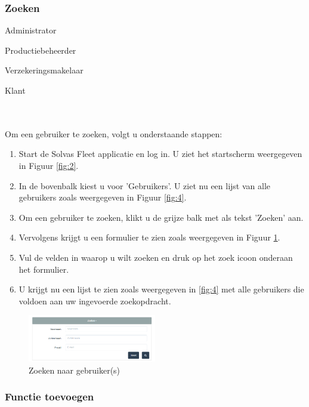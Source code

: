 \documentclass[11pt,openany]{article}
\newcommand{\cmark}{\ding{51}}%
\newcommand{\done}{\rlap{$\square$}{\raisebox{2pt}{\large\hspace{1pt}\cmark}}%
	\hspace{-2.5pt}}
\begin{document}
\subsubsection{Zoeken}
\begin{todolist}
	\item[\done] Administrator
	\item[\done] Productiebeheerder
	\item[\done] Verzekeringsmakelaar
	\item[\done] Klant 
\end{todolist}
\\
\\
Om een gebruiker te zoeken, volgt u onderstaande stappen:
\begin{enumerate}
	\item Start de Solvas Fleet applicatie en log in. U ziet het startscherm weergegeven in Figuur \ref{fig:2}.
	\item In de bovenbalk kiest u voor 'Gebruikers'. U ziet nu een lijst van alle gebruikers zoals weergegeven in Figuur \ref{fig:4}.
	\item Om een gebruiker te zoeken, klikt u de grijze balk met als tekst 'Zoeken' aan. 
	\item Vervolgens krijgt u een formulier te zien zoals weergegeven in Figuur \ref{fig:8}.
	\item Vul de velden in waarop u wilt zoeken en druk op het zoek icoon onderaan het formulier.
	\item U krijgt nu een lijst te zien zoals weergegeven in \ref{fig:4} met alle gebruikers die voldoen aan uw ingevoerde zoekopdracht.
\end{enumerate}

\begin{figure}
	\centering
	\includegraphics[width=0.5\textwidth]{img/fig8.png}
	\caption{Zoeken naar gebruiker(s)} 
	\label{fig:8} 
\end{figure}


\subsubsection{Functie toevoegen}
\end{document}
